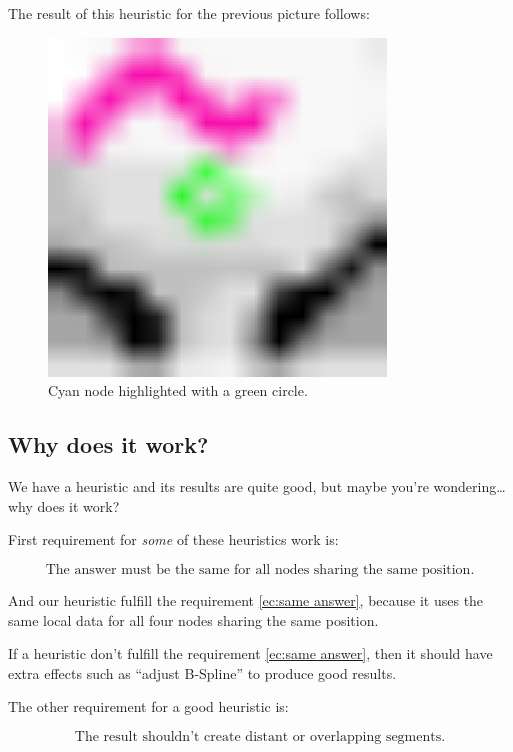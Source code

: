 The result of this heuristic for the previous picture follows:

\begin{figure}[H]
  \centering
  \includegraphics[width=0.8\textwidth]{assets/boof_cyan2.pdf}
  \caption{Cyan node highlighted with a green circle.}
\end{figure}

\subsection{Why does it work?}

We have a heuristic and its results are quite good, but maybe you're
wondering\ldots why does it work?

First requirement for \emph{some} of these heuristics work is:

\begin{equation}
  \label{ec:same answer}
  \text{The answer must be the same for all nodes sharing the same position.}
\end{equation}

And our heuristic fulfill the requirement \ref{ec:same answer}, because it uses
the same local data for all four nodes sharing the same position.

If a heuristic don't fulfill the requirement \ref{ec:same answer}, then it
should have extra effects such as ``adjust B-Spline'' to produce good results.

The other requirement for a good heuristic is:

\begin{equation}
  \label{ec:visually connected}
  \text{The result shouldn't create distant or overlapping segments.}
\end{equation}

